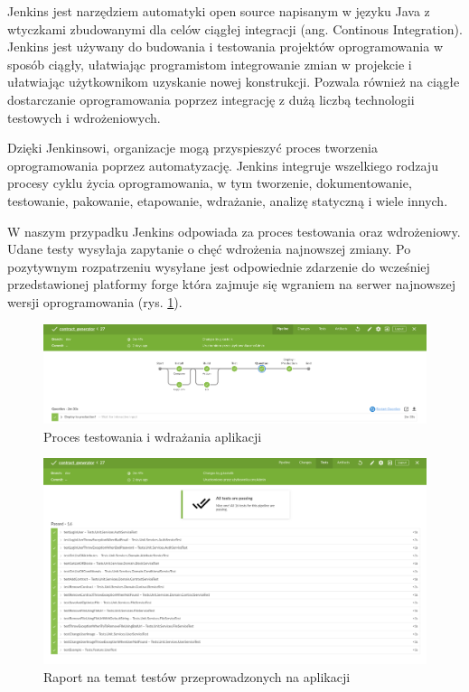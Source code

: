 Jenkins jest narzędziem automatyki open source napisanym w języku Java z wtyczkami zbudowanymi dla celów ciągłej integracji (ang. Continous Integration). Jenkins jest używany do budowania i testowania projektów oprogramowania w sposób ciągły, ułatwiając programistom integrowanie zmian w projekcie i ułatwiając użytkownikom uzyskanie nowej konstrukcji. Pozwala również na ciągłe dostarczanie oprogramowania poprzez integrację z dużą liczbą technologii testowych i wdrożeniowych.

Dzięki Jenkinsowi, organizacje mogą przyspieszyć proces tworzenia oprogramowania poprzez automatyzację. Jenkins integruje wszelkiego rodzaju procesy cyklu życia oprogramowania, w tym tworzenie, dokumentowanie, testowanie, pakowanie, etapowanie, wdrażanie, analizę statyczną i wiele innych.

W naszym przypadku Jenkins odpowiada za proces testowania oraz wdrożeniowy. Udane testy wysyłaja zapytanie o chęć wdrożenia najnowszej zmiany. Po pozytywnym rozpatrzeniu wysyłane jest odpowiednie zdarzenie do wcześniej przedstawionej platformy forge która zajmuje się wgraniem na serwer najnowszej wersji oprogramowania (rys. \ref{fig:jenkins}).

\begin{figure}[H]
    \centering
    \includegraphics[width=6in]{images/jenkins.png}
    \caption{Proces testowania i wdrażania aplikacji \label{fig:jenkins}}
\end{figure}

\begin{figure}[H]
    \centering
    \includegraphics[width=6in]{images/jenkins-test.png}
    \caption{Raport na temat testów przeprowadzonych na aplikacji \label{fig:jenkins-test}}
\end{figure}

